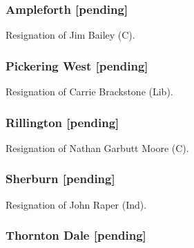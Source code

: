 \documentclass[a4paper,openany]{book}
\begin{document}
\begin{resultsiii}
\subsubsection*{Ampleforth \hspace*{\fill}\nolinebreak[1]%
	\enspace\hspace*{\fill}
	[pending]}


Resignation of Jim Bailey (C).

\subsubsection*{Pickering West \hspace*{\fill}\nolinebreak[1]%
	\enspace\hspace*{\fill}
	[pending]}


Resignation of Carrie Brackstone (Lib).

\subsubsection*{Rillington \hspace*{\fill}\nolinebreak[1]%
	\enspace\hspace*{\fill}
	[pending]}


Resignation of Nathan Garbutt Moore (C).

\subsubsection*{Sherburn \hspace*{\fill}\nolinebreak[1]%
	\enspace\hspace*{\fill}
	[pending]}


Resignation of John Raper (Ind).

\subsubsection*{Thornton Dale \hspace*{\fill}\nolinebreak[1]%
	\enspace\hspace*{\fill}
	[pending]}


\end{resultsiii}
\end{document}

